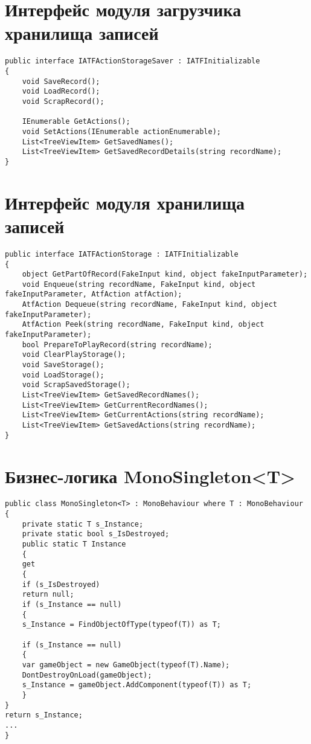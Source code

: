 \section{Интерфейс модуля загрузчика хранилища записей}
\begin{lstlisting}[caption={Интерфейс модуля загрузчика хранилища записей},label=iSaver]
public interface IATFActionStorageSaver : IATFInitializable
{
	void SaveRecord();
	void LoadRecord();
	void ScrapRecord();
	
	IEnumerable GetActions();
	void SetActions(IEnumerable actionEnumerable);
	List<TreeViewItem> GetSavedNames();
	List<TreeViewItem> GetSavedRecordDetails(string recordName);
}
\end{lstlisting}
\newpage
\section{Интерфейс модуля хранилища записей}
\begin{lstlisting}[caption={Интерфейс модуля хранилища записей},label=iStorage]
public interface IATFActionStorage : IATFInitializable
{
	object GetPartOfRecord(FakeInput kind, object fakeInputParameter);
	void Enqueue(string recordName, FakeInput kind, object fakeInputParameter, AtfAction atfAction);
	AtfAction Dequeue(string recordName, FakeInput kind, object fakeInputParameter);
	AtfAction Peek(string recordName, FakeInput kind, object fakeInputParameter);
	bool PrepareToPlayRecord(string recordName);
	void ClearPlayStorage();
	void SaveStorage();
	void LoadStorage();
	void ScrapSavedStorage();
	List<TreeViewItem> GetSavedRecordNames();
	List<TreeViewItem> GetCurrentRecordNames();
	List<TreeViewItem> GetCurrentActions(string recordName);
	List<TreeViewItem> GetSavedActions(string recordName);
}
\end{lstlisting}
\newpage
\section{Бизнес-логика MonoSingleton<T>}
\begin{lstlisting}[caption={Бизнес-логика MonoSingleton<T>},label=monoSingleton]
public class MonoSingleton<T> : MonoBehaviour where T : MonoBehaviour
{
	private static T s_Instance;
	private static bool s_IsDestroyed;
	public static T Instance
	{
	get
	{
	if (s_IsDestroyed)
	return null;
	if (s_Instance == null)
	{
	s_Instance = FindObjectOfType(typeof(T)) as T;
	
	if (s_Instance == null)
	{
	var gameObject = new GameObject(typeof(T).Name); 
	DontDestroyOnLoad(gameObject);
	s_Instance = gameObject.AddComponent(typeof(T)) as T;
	}
}
return s_Instance;
...
}
\end{lstlisting}
\newpage
